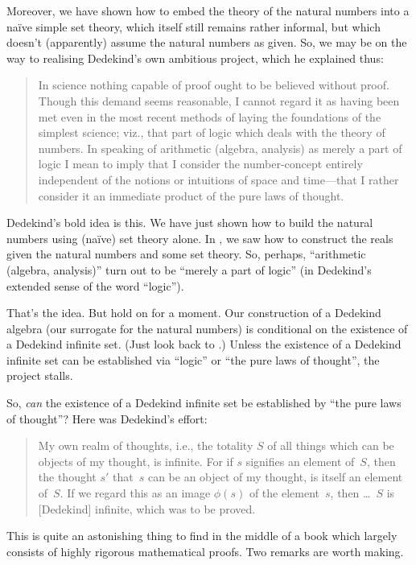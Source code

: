  Moreover, we have shown how to embed the theory of the natural
 numbers into a na\"ive simple set theory, which itself still remains
 rather informal, but which doesn't (apparently) assume the natural
 numbers as given. So, we may be on the way to realising Dedekind's
 own ambitious project, which he explained thus:
\begin{quote}
	In science nothing capable of proof ought to be believed without
	proof. Though this demand seems reasonable, I cannot regard it as
	having been met even in the most recent methods of laying the
	foundations of the simplest science; viz., that part of logic
	which deals with the theory of numbers. In speaking of arithmetic
	(algebra, analysis) as merely a part of logic I mean to imply that
	I consider the number-concept entirely independent of the notions
	or intuitions of space and time---that I rather consider it an
	immediate product of the pure laws of thought.
	\citep[preface]{Dedekind1888}
\end{quote}
Dedekind's bold idea is this. We have just shown how to build the
natural numbers using (na\"ive) set theory alone. In
, we saw how to construct the reals given
the natural numbers and some set theory. So, perhaps, ``arithmetic
(algebra, analysis)'' turn out to be ``merely a part of logic'' (in
Dedekind's extended sense of the word ``logic'').

That's the idea. But hold on for a moment. Our construction of a
Dedekind algebra (our surrogate for the natural numbers) is
conditional on the existence of a Dedekind infinite set. (Just look
back to .)
Unless the existence of a Dedekind infinite set can be established via
``logic'' or ``the pure laws of thought'', the project stalls. 

So, \emph{can} the existence of a Dedekind infinite set be established
by ``the pure laws of thought''? Here was Dedekind's effort:
\begin{quote}
  My own realm of thoughts, i.e., the totality $S$ of all things which
  can be objects of my thought, is infinite. For if $s$ signifies an
  element of~$S$, then the thought $s'$ that~$s$ can be an object of
  my thought, is itself an element of~$S$. If we regard this as an
  image $\phi(s)$ of the element~$s$, then \dots~$S$ is [Dedekind]
  infinite, which was to be proved.
	\citep[\S66]{Dedekind1888}
\end{quote}
This is quite an astonishing thing to find in the middle of a book
which largely consists of highly rigorous mathematical proofs. Two
remarks are worth making. 

